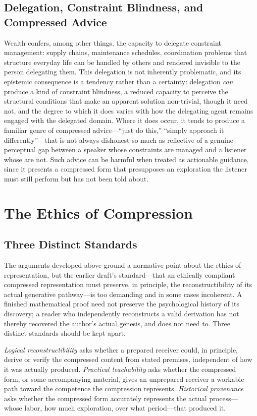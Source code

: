 \documentclass[12pt, a4paper]{article}
\theoremstyle{plain}
\theoremstyle{definition}
\theoremstyle{remark}
\begin{document}
\subsection{Delegation, Constraint Blindness, and Compressed Advice}

Wealth confers, among other things, the capacity to delegate constraint management: supply chains, maintenance schedules, coordination problems that structure everyday life can be handled by others and rendered invisible to the person delegating them. This delegation is not inherently problematic, and its epistemic consequence is a tendency rather than a certainty: delegation \emph{can} produce a kind of constraint blindness, a reduced capacity to perceive the structural conditions that make an apparent solution non-trivial, though it need not, and the degree to which it does varies with how the delegating agent remains engaged with the delegated domain. Where it does occur, it tends to produce a familiar genre of compressed advice---``just do this,'' ``simply approach it differently''---that is not always dishonest so much as reflective of a genuine perceptual gap between a speaker whose constraints are managed and a listener whose are not. Such advice can be harmful when treated as actionable guidance, since it presents a compressed form that presupposes an exploration the listener must still perform but has not been told about.

\section{The Ethics of Compression}
\label{sec:ethics}

\subsection{Three Distinct Standards}

The arguments developed above ground a normative point about the ethics of representation, but the earlier draft's standard---that an ethically compliant compressed representation must preserve, in principle, the reconstructibility of its actual generative pathway---is too demanding and in some cases incoherent. A finished mathematical proof need not preserve the psychological history of its discovery; a reader who independently reconstructs a valid derivation has not thereby recovered the author's actual genesis, and does not need to. Three distinct standards should be kept apart.

\emph{Logical reconstructibility} asks whether a prepared receiver could, in principle, derive or verify the compressed content from stated premises, independent of how it was actually produced. \emph{Practical teachability} asks whether the compressed form, or some accompanying material, gives an unprepared receiver a workable path toward the competence the compression represents. \emph{Historical provenance} asks whether the compressed form accurately represents the actual process---whose labor, how much exploration, over what period---that produced it.
\end{document}
